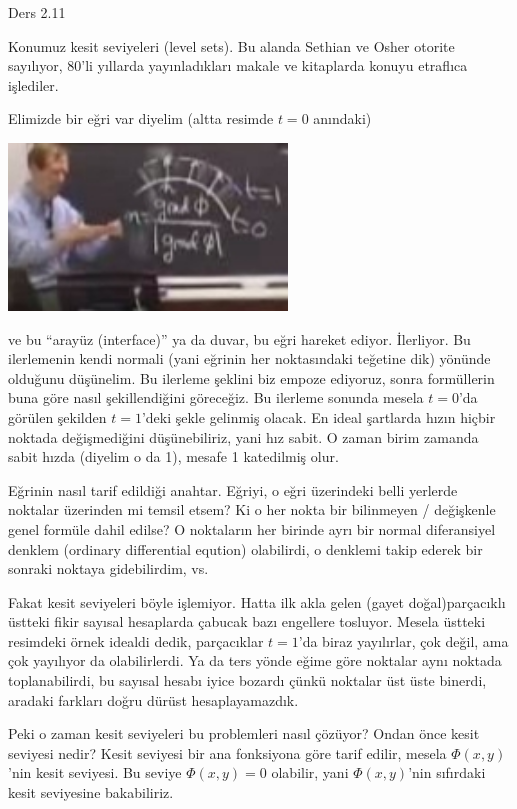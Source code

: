 \documentclass[12pt,fleqn]{article}\usepackage{../../common}
\begin{document}
Ders 2.11

Konumuz kesit seviyeleri (level sets). Bu alanda Sethian ve Osher otorite
sayılıyor, 80'li yıllarda yayınladıkları makale ve kitaplarda konuyu etraflıca
işlediler.

Elimizde bir eğri var diyelim (altta resimde $t=0$ anındaki)

\includegraphics[width=20em]{2_11_01.jpg}

ve bu ``arayüz (interface)'' ya da duvar, bu eğri hareket ediyor. İlerliyor. Bu
ilerlemenin kendi normali (yani eğrinin her noktasındaki teğetine dik) yönünde
olduğunu düşünelim. Bu ilerleme şeklini biz empoze ediyoruz, sonra formüllerin
buna göre nasıl şekillendiğini göreceğiz. Bu ilerleme sonunda mesela $t=0$'da
görülen şekilden $t=1$'deki şekle gelinmiş olacak. En ideal şartlarda hızın
hiçbir noktada değişmediğini düşünebiliriz, yani hız sabit. O zaman birim
zamanda sabit hızda (diyelim o da 1), mesafe 1 katedilmiş olur.

Eğrinin nasıl tarif edildiği anahtar. Eğriyi, o eğri üzerindeki belli yerlerde
noktalar üzerinden mi temsil etsem? Ki o her nokta bir bilinmeyen / değişkenle
genel formüle dahil edilse? O noktaların her birinde ayrı bir normal
diferansiyel denklem (ordinary differential eqution) olabilirdi, o denklemi
takip ederek bir sonraki noktaya gidebilirdim, vs. 

Fakat kesit seviyeleri böyle işlemiyor. Hatta ilk akla gelen (gayet
doğal)parçacıklı üstteki fikir sayısal hesaplarda çabucak bazı engellere
tosluyor. Mesela üstteki resimdeki örnek idealdi dedik, parçacıklar $t=1$'da
biraz yayılırlar, çok değil, ama çok yayılıyor da olabilirlerdi. Ya da ters
yönde eğime göre noktalar aynı noktada toplanabilirdi, bu sayısal hesabı iyice
bozardı çünkü noktalar üst üste binerdi, aradaki farkları doğru dürüst
hesaplayamazdık.

Peki o zaman kesit seviyeleri bu problemleri nasıl çözüyor? Ondan önce kesit
seviyesi nedir? Kesit seviyesi bir ana fonksiyona göre tarif edilir, mesela
$\Phi(x,y)$'nin kesit seviyesi. Bu seviye $\Phi(x,y) = 0$ olabilir, yani
$\Phi(x,y)$'nin sıfırdaki kesit seviyesine bakabiliriz.
\end{document}

